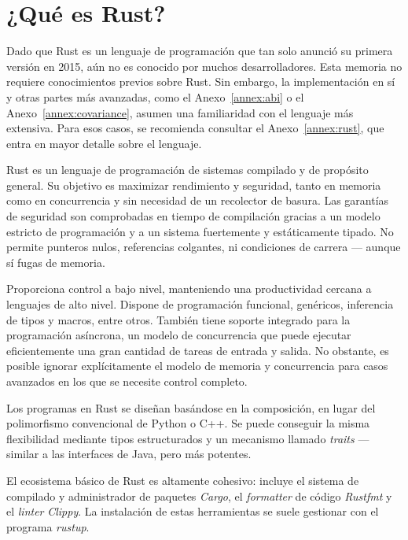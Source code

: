 
\chapter{¿Qué es Rust?}\label{ch:rust}

Dado que Rust es un lenguaje de programación que tan solo anunció su primera
versión en 2015, aún no es conocido por muchos desarrolladores. Esta memoria no
requiere conocimientos previos sobre Rust. Sin embargo, la implementación en sí
y otras partes más avanzadas, como el Anexo~\ref{annex:abi} o el
Anexo~\ref{annex:covariance}, asumen una familiaridad con el lenguaje más
extensiva. Para esos casos, se recomienda consultar el Anexo~\ref{annex:rust},
que entra en mayor detalle sobre el lenguaje.

Rust es un lenguaje de programación de sistemas compilado y de propósito
general. Su objetivo es maximizar rendimiento y seguridad, tanto en memoria como
en concurrencia y sin necesidad de un recolector de basura. Las garantías de
seguridad son comprobadas en tiempo de compilación gracias a un modelo estricto
de programación y a un sistema fuertemente y estáticamente tipado. No permite
punteros nulos, referencias colgantes, ni condiciones de carrera --- aunque sí
fugas de memoria.

Proporciona control a bajo nivel, manteniendo una productividad cercana a
lenguajes de alto nivel. Dispone de programación funcional, genéricos,
inferencia de tipos y macros, entre otros. También tiene soporte integrado para
la programación asíncrona, un modelo de concurrencia que puede ejecutar
eficientemente una gran cantidad de tareas de entrada y salida. No obstante, es
posible ignorar explícitamente el modelo de memoria y concurrencia para casos
avanzados en los que se necesite control completo.

Los programas en Rust se diseñan basándose en la composición, en lugar del
polimorfismo convencional de Python o C++. Se puede conseguir la misma
flexibilidad mediante tipos estructurados y un mecanismo llamado \emph{traits}
--- similar a las interfaces de Java, pero más potentes.

El ecosistema básico de Rust es altamente cohesivo: incluye el sistema de
compilado y administrador de paquetes \emph{Cargo}, el \emph{formatter} de
código \emph{Rustfmt} y el \emph{linter} \emph{Clippy}. La instalación de estas
herramientas se suele gestionar con el programa \emph{rustup}.
